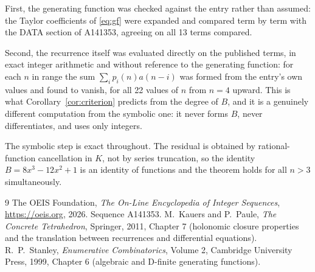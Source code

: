 \documentclass[11pt,a4paper]{article}
\theoremstyle{plain}
\theoremstyle{definition}
\begin{document}
First, the generating function was checked against the entry rather than assumed: the
Taylor coefficients of \eqref{eq:gf} were expanded and compared term by term with the DATA
section of A141353, agreeing on all 13 terms compared.

Second, the recurrence itself was evaluated directly on the published terms, in exact
integer arithmetic and without reference to the generating function: for each $n$ in range
the sum $\sum_{i}p_{i}(n)a(n-i)$ was formed from the entry's own values and found to
vanish, for all 22 values of $n$ from $n=4$ upward. This is what
Corollary~\ref{cor:criterion} predicts from the degree of $B$, and it is a genuinely
different computation from the symbolic one: it never forms $B$, never differentiates, and
uses only integers.

The symbolic step is exact throughout. The residual is obtained by rational-function
cancellation in $K$, not by series truncation, so the identity $B=8 x^{3} - 12 x^{2} + 1$ is an
identity of functions and the theorem holds for all $n>3$ simultaneously.

\begin{thebibliography}{9}
 The OEIS Foundation, \emph{The On-Line Encyclopedia of Integer Sequences},
\url{https://oeis.org}, 2026. Sequence A141353.
 M.~Kauers and P.~Paule, \emph{The Concrete Tetrahedron}, Springer, 2011,
Chapter 7 (holonomic closure properties and the translation between recurrences and
differential equations).
 R.~P.~Stanley, \emph{Enumerative Combinatorics}, Volume 2, Cambridge
University Press, 1999, Chapter 6 (algebraic and D-finite generating functions).
\end{thebibliography}
\end{document}
